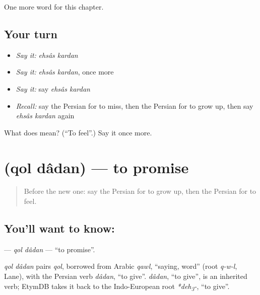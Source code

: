 \begin{grammarlens}[title={What you've built}]
One more word for this chapter.
\end{grammarlens}

\subsection*{Your turn}
\begin{itemize}
\raggedright
  \item \emph{Say it:} \emph{ehsâs kardan}
  \item \emph{Say it:} \emph{ehsâs kardan}, once more
  \item \emph{Say it:} say \emph{ehsâs kardan}
  \item \emph{Recall:} say the Persian for to miss, then the Persian for to grow up, then say \emph{ehsâs kardan} again
\end{itemize}

\begin{tcolorbox}[breakable,colback=teal!4,colframe=teal!35!black,title={Before you move on}]
What does   mean? (\textquotedblleft{}To feel\textquotedblright{}.) Say it once more.
\end{tcolorbox}
\section[\texorpdfstring{\fa{قول} \fa{دادن} (qol dâdan)}{قول دادن (qol dâdan)}]{  (qol dâdan) — to promise}

\label{lesson:FA-C257-qol-dadan}



\begin{quote}
Before the new one: say the Persian for to grow up, then the Persian for to feel.
\end{quote}

\subsection*{You'll want to know:  }
\textbf{ } — \emph{qol dâdan} — \textquotedblleft{}to promise\textquotedblright{}.

\begin{cousinweb}
\emph{qol dâdan} pairs \emph{qol}, borrowed from Arabic \emph{qawl}, \textquotedblleft{}saying, word\textquotedblright{} (root \emph{q-w-l}, Lane), with the Persian verb \emph{dâdan}, \textquotedblleft{}to give\textquotedblright{}. \emph{dâdan}, \textquotedblleft{}to give\textquotedblright{}, is an inherited verb; EtymDB takes it back to the Indo-European root \emph{*deh\textsubscript{3}-}, \textquotedblleft{}to give\textquotedblright{}.
\end{cousinweb}

